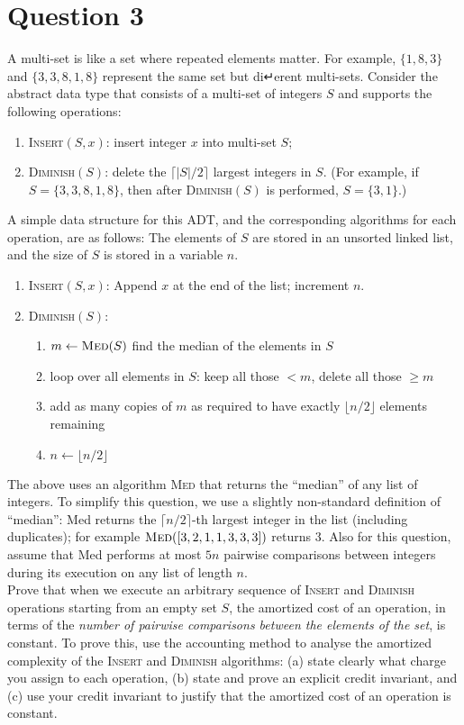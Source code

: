 \documentclass[11pt]{article}
\begin{document}
\section*{Question 3}
A multi-set is like a set where repeated elements matter. For example, $\{ 1, 8, 3\}$ and $\{ 3, 3, 8, 1, 8\}$ represent the same set but di↵erent multi-sets. Consider the abstract data type that consists of a multi-set of integers $S$ and supports the following operations:
\begin{enumerate}
  \item  \textsc{Insert}$(S, x)$: insert integer $x$ into multi-set $S$;
  \item \textsc{Diminish}$(S)$: delete the $\lceil |S|/2 \rceil$ largest integers in $S$. (For example, if $S = \{ 3, 3, 8, 1, 8\}$, then after \textsc{Diminish}$(S)$ is performed, $S = \{ 3, 1\}$.)
\end{enumerate}
A simple data structure for this ADT, and the corresponding algorithms for each operation, are as follows: The elements of $S$ are stored in an unsorted linked list, and the size of $S$ is stored in a variable $n$.

\begin{enumerate}
  \item \textsc{Insert}$(S, x)$: Append $x$ at the end of the list; increment $n$.
  \item \textsc{Diminish}$(S)$:
  \begin{enumerate}
    \item $m \leftarrow \textsc{Med}(S)$ find the median of the elements in $S$
    \item loop over all elements in $S$: keep all those $< m$, delete all those $\geq m$
    \item  add as many copies of $m$ as required to have exactly $\lfloor n / 2\rfloor$ elements remaining
    \item $n \leftarrow \lfloor n / 2 \rfloor$
  \end{enumerate}
\end{enumerate}
The above uses an algorithm \textsc{Med} that returns the “median” of any list of integers. To simplify this question, we use a slightly non-standard definition of “median”: Med returns the $\lceil n / 2\rceil$-th largest integer in the list (including duplicates); for example $\textsc{Med}([3, 2, 1, 1, 3, 3, 3])$ returns 3. Also for this question, assume that Med performs at most $5n$ pairwise comparisons between integers during its execution on any list of length $n$. \\
Prove that when we execute an arbitrary sequence of \textsc{Insert} and \textsc{Diminish} operations starting from an empty set $S$, the amortized cost of an operation, in terms of the \textit{number of pairwise comparisons between the elements of the set}, is constant. To prove this, use the accounting method to analyse the amortized complexity of the \textsc{Insert} and \textsc{Diminish} algorithms: (a) state clearly what charge you assign to each operation, (b) state and prove an explicit credit invariant, and (c) use your credit invariant to justify that the amortized cost of an operation is constant.
\end{document}
